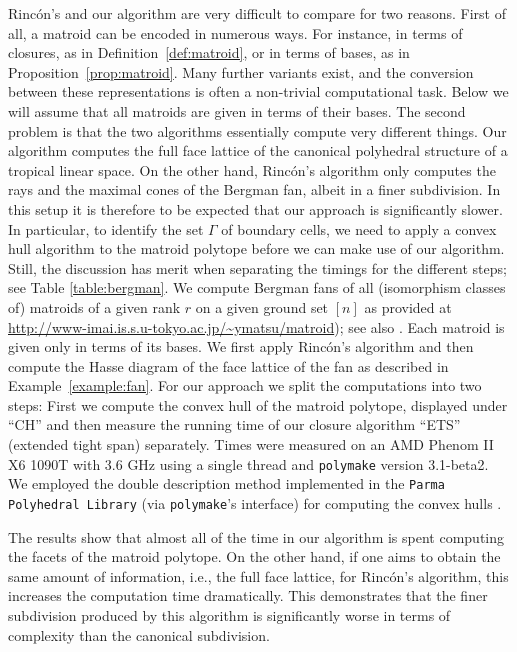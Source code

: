 \documentclass[11pt,a4paper]{amsart}
\theoremstyle{definition}
\theoremstyle{plain}
\begin{document}
Rinc\'{o}n's and our algorithm are very difficult to compare for two reasons.
First of all, a matroid can be encoded in numerous ways. 
For instance, in terms of closures, as in Definition~\ref{def:matroid}, or in terms of bases, as in Proposition~\ref{prop:matroid}.
Many further variants exist, and the conversion between these representations is often a non-trivial computational task. 
Below we will assume that all matroids are given in terms of their bases. 
The second problem is that the two algorithms essentially compute very different things. 
Our algorithm computes the full face lattice of the canonical polyhedral structure of a tropical linear space. 
On the other hand, Rinc\'{o}n's algorithm only computes the rays and the maximal cones of the Bergman fan, albeit in a finer subdivision. 
In this setup it is therefore to be expected that our approach is significantly slower. 
In particular, to identify the set $\Gamma$ of boundary cells, we need to apply a convex hull algorithm to the matroid polytope before we can make use of our algorithm.
Still, the discussion has merit when separating the timings for the different steps; see Table \ref{table:bergman}.
We compute Bergman fans of all (isomorphism classes of) matroids of a given rank $r$ on a given ground set $[n]$ as provided at \url{http://www-imai.is.s.u-tokyo.ac.jp/~ymatsu/matroid}); see also \cite{Matsumotoetal:2012}.
Each matroid is given only in terms of its bases. 
We first apply Rinc\'{o}n's algorithm and then compute the Hasse diagram of the face lattice of the fan as described in Example~\ref{example:fan}. 
For our approach we split the computations into two steps: 
First we compute the convex hull of the matroid polytope, displayed under \enquote{CH} and then measure the running time of our closure algorithm \enquote{ETS} (extended tight span) separately. 
Times were measured on an AMD Phenom II X6 1090T with 3.6 GHz using a single thread and {\texttt{poly\-make}\xspace} version 3.1-beta2.
We employed the double description method implemented in the \texttt{Parma Polyhedral Library} (via {\texttt{poly\-make}\xspace}'s interface) for computing the convex hulls \cite{PPL}.

The results show that almost all of the time in our algorithm is spent computing the facets of the matroid polytope. 
On the other hand, if one aims to obtain the same amount of information, i.e., the full face lattice, for Rinc\'{o}n's algorithm, this increases the computation time dramatically. This demonstrates that the finer subdivision produced by this algorithm is significantly worse in terms of complexity than the canonical subdivision.
\end{document}
